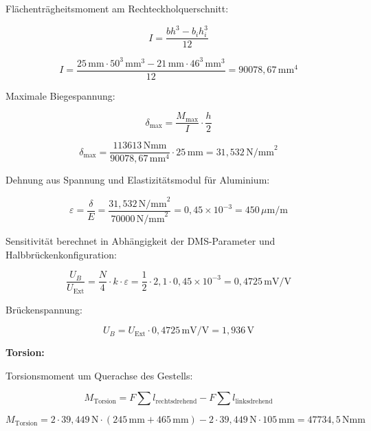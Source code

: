 Flächenträgheitsmoment am Rechteckholquerschnitt:

\begin{equation}
I = \frac{b h^3 - b_i h_i^3}{12}
\end{equation}

\begin{equation}
I = \frac{25\,\text{mm} \cdot 50^3\,\text{mm}^3 - 21\,\text{mm} \cdot 46^3\,\text{mm}^3}{12} = 90078,67\,\text{mm}^4
\end{equation}

Maximale Biegespannung:

\begin{equation}
\delta_{\text{max}} = \frac{M_{\text{max}}}{I} \cdot \frac{h}{2}
\end{equation}

\begin{equation}
\delta_{\text{max}} = \frac{113613\,\text{Nmm}}{90078,67\,\text{mm}^4} \cdot 25\,\text{mm} = 31,532\,\text{N/mm}^2
\end{equation}

Dehnung aus Spannung und Elastizitätsmodul für Aluminium:

\begin{equation}
\varepsilon = \frac{\delta}{E} = \frac{31,532\,\text{N/mm}^2}{70000\,\text{N/mm}^2} = 0,45 \times 10^{-3} = 450\,\mu\text{m/m}
\end{equation}

Sensitivität berechnet in Abhängigkeit der DMS-Parameter und Halbbrückenkonfiguration:

\begin{equation}
\frac{U_B}{U_{\text{Ext}}} = \frac{N}{4} \cdot k \cdot \varepsilon = \frac{1}{2} \cdot 2,1 \cdot 0,45 \times 10^{-3} = 0,4725\,\text{mV/V}
\end{equation}

Brückenspannung:

\begin{equation}
U_B = U_{\text{Ext}} \cdot 0,4725\,\text{mV/V} = 1,936\,\text{V}
\end{equation}

\textbf{Torsion:}

Torsionsmoment um Querachse des Gestells:

\begin{equation}
M_{\text{Torsion}} = F \sum l_{\text{rechtsdrehend}} - F \sum l_{\text{linksdrehend}}
\end{equation}

\begin{equation}
M_{\text{Torsion}} = 2 \cdot 39,449\,\text{N} \cdot (245\,\text{mm} + 465\,\text{mm}) - 2 \cdot 39,449\,\text{N} \cdot 105\,\text{mm} = 47734,5\,\text{Nmm}
\end{equation}

